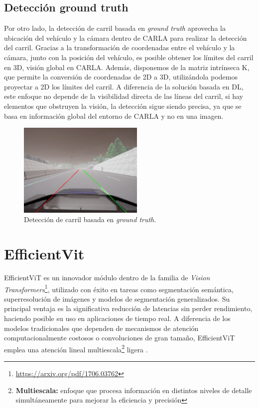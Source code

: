 \subsection{Detección ground truth}
\label{sec:gt}

Por otro lado, la detección de carril basada en \textit{ground truth} aprovecha la ubicación del vehículo y la cámara dentro de CARLA para realizar la detección del carril. Gracias a la transformación de coordenadas entre el vehículo y la cámara, junto con la posición del vehículo, es posible obtener los límites del carril en 3D, visión global en CARLA. Además, disponemos de la matriz intrínseca K, que permite la conversión de coordenadas de 2D a 3D, utilizándola podemos proyectar a 2D los límites del carril. A diferencia de la solución basada en \ac{DL}, este enfoque no depende de la visibilidad directa de las líneas del carril, si hay elementos que obstruyen la visión, la detección sigue siendo precisa, ya que se basa en información global del entorno de CARLA y no en una imagen.

\begin{figure}[ht]
  \begin{center}
    \includegraphics[width=6cm]{figs/Plataformas_Desarollo/ground_truth.png}
  \end{center}
  \caption{Detección de carril basada en \textit{ground truth}.}
  \label{dl_lane}
\end{figure}

\section{EfficientVit}
\label{sec:ef}

EfficientViT es un innovador módulo dentro de la familia de \textit{Vision Transformers}\footnote{\url{https://arxiv.org/pdf/1706.03762}}, utilizado con éxito en tareas como segmentación semántica, superresolución de imágenes y modelos de segmentación generalizados. Su principal ventaja es la significativa reducción de latencias sin perder rendimiento, haciendo posible su uso en aplicaciones de tiempo real. A diferencia de los modelos tradicionales que dependen de mecanismos de atención computacionalmente costosos o convoluciones de gran tamaño, EfficientViT emplea una atención lineal multiescala\footnote{\textbf{Multiescala:} enfoque que procesa información en distintos niveles de detalle simultáneamente para mejorar la eficiencia y precisión} ligera \cite{efficientvit}.

